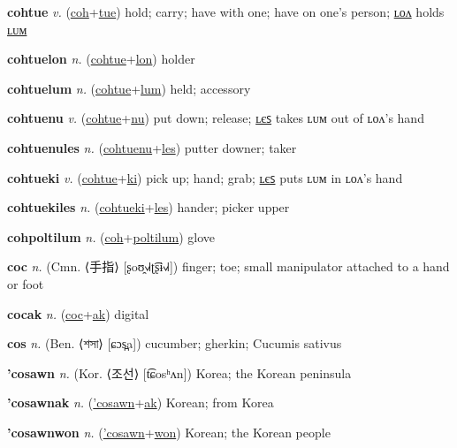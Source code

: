 \textbf{\hypertarget{cohtue}{cohtue}} \textit{v.} (\hyperlink{coh}{coh}+\allowbreak \hyperlink{tue}{tue})
hold; carry; have with one; have on one’s person; \hyperlink{cohtuelon}{ʟᴏᴧ} holds \hyperlink{cohtuelum}{ʟᴜᴍ}

\textbf{\hypertarget{cohtuelon}{cohtuelon}} \textit{n.} (\hyperlink{cohtue}{cohtue}+\allowbreak \hyperlink{lon}{lon})
holder

\textbf{\hypertarget{cohtuelum}{cohtuelum}} \textit{n.} (\hyperlink{cohtue}{cohtue}+\allowbreak \hyperlink{lum}{lum})
held; accessory

\textbf{\hypertarget{cohtuenu}{cohtuenu}} \textit{v.} (\hyperlink{cohtue}{cohtue}+\allowbreak \hyperlink{nu}{nu})
put down; release; \hyperlink{cohtuenules}{ʟєꜱ} takes ʟᴜᴍ out of ʟᴏᴧ’s hand

\textbf{\hypertarget{cohtuenules}{cohtuenules}} \textit{n.} (\hyperlink{cohtuenu}{cohtuenu}+\allowbreak \hyperlink{les}{les})
putter downer; taker

\textbf{\hypertarget{cohtueki}{cohtueki}} \textit{v.} (\hyperlink{cohtue}{cohtue}+\allowbreak \hyperlink{ki}{ki})
pick up; hand; grab; \hyperlink{cohtuekiles}{ʟєꜱ} puts ʟᴜᴍ in ʟᴏᴧ’s hand

\textbf{\hypertarget{cohtuekiles}{cohtuekiles}} \textit{n.} (\hyperlink{cohtueki}{cohtueki}+\allowbreak \hyperlink{les}{les})
hander; picker upper

\textbf{\hypertarget{cohpoltilum}{cohpoltilum}} \textit{n.} (\hyperlink{coh}{coh}+\allowbreak \hyperlink{poltilum}{poltilum})
glove

\textbf{\hypertarget{coc}{coc}} \textit{n.} (Cmn. ⟨{\chinese{}手指}⟩ [ʂoʊ̯˧˩˧ʈ͡ʂɨ˧˩˧])
finger; toe; small manipulator attached to a hand or foot

\textbf{\hypertarget{cocak}{cocak}} \textit{n.} (\hyperlink{coc}{coc}+\allowbreak \hyperlink{ak}{ak})
digital

\textbf{\hypertarget{cos}{cos}} \textit{n.} (Ben. ⟨{\bengali{}শসা}⟩ [ɕɔs̪a])
cucumber; gherkin; Cucumis sativus

\textbf{\hypertarget{'cosawn}{'cosawn}} \textit{n.} (Kor. ⟨{\korean{}조선}⟩ [t͡ɕosʰʌn])
Korea; the Korean peninsula

\textbf{\hypertarget{'cosawnak}{'cosawnak}} \textit{n.} (\hyperlink{'cosawn}{'cosawn}+\allowbreak \hyperlink{ak}{ak})
Korean; from Korea

\textbf{\hypertarget{'cosawnwon}{'cosawnwon}} \textit{n.} (\hyperlink{'cosawn}{'cosawn}+\allowbreak \hyperlink{won}{won})
Korean; the Korean people


